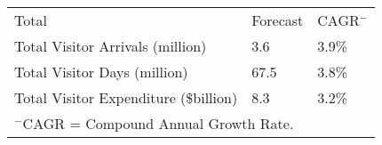 \begin{tabular}[t]{p{5.1cm}>{\hfill}p{1.1cm}>{\hfill}p{1.3cm}}
 Total & Forecast & CAGR$^-$ \\ 
 Total Visitor Arrivals (million) & 3.6 & 3.9\% \\ 
  Total Visitor Days (million) & 67.5 & 3.8\% \\ 
  Total Visitor Expenditure (\$billion) & 8.3 & 3.2\% \\ 
  
\multicolumn{3}{p{8.25cm}}{$^-$CAGR = Compound Annual Growth Rate.}\\ \end{tabular}
